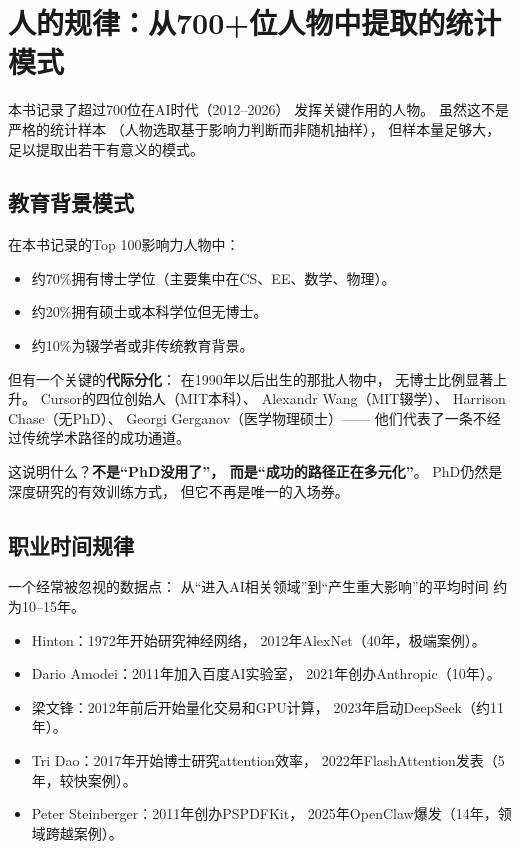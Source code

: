 \section{人的规律：从700+位人物中提取的统计模式}
\label{sec:fg-people-patterns}

本书记录了超过700位在AI时代（2012--2026）
发挥关键作用的人物。
虽然这不是严格的统计样本
（人物选取基于影响力判断而非随机抽样），
但样本量足够大，足以提取出若干有意义的模式。

\subsection{教育背景模式}

在本书记录的Top 100影响力人物中：

\begin{itemize}
  \item 约70\%拥有博士学位（主要集中在CS、EE、数学、物理）。
  \item 约20\%拥有硕士或本科学位但无博士。
  \item 约10\%为辍学者或非传统教育背景。
\end{itemize}

但有一个关键的\textbf{代际分化}：
在1990年以后出生的那批人物中，
无博士比例显著上升。
Cursor的四位创始人（MIT本科）、
Alexandr Wang（MIT辍学）、
Harrison Chase（无PhD）、
Georgi Gerganov（医学物理硕士）——
他们代表了一条不经过传统学术路径的成功通道。

这说明什么？\textbf{不是``PhD没用了''，
而是``成功的路径正在多元化''}。
PhD仍然是深度研究的有效训练方式，
但它不再是唯一的入场券。

\subsection{职业时间规律}

一个经常被忽视的数据点：
从``进入AI相关领域''到``产生重大影响''的平均时间
约为10--15年。

\begin{itemize}
  \item Hinton：1972年开始研究神经网络，
    2012年AlexNet（40年，极端案例）。
  \item Dario Amodei：2011年加入百度AI实验室，
    2021年创办Anthropic（10年）。
  \item 梁文锋：2012年前后开始量化交易和GPU计算，
    2023年启动DeepSeek（约11年）。
  \item Tri Dao：2017年开始博士研究attention效率，
    2022年FlashAttention发表（5年，较快案例）。
  \item Peter Steinberger：2011年创办PSPDFKit，
    2025年OpenClaw爆发（14年，领域跨越案例）。
\end{itemize}


